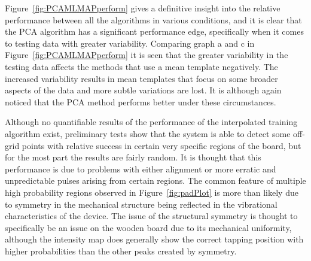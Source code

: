 Figure~\ref{fig:PCAMLMAPperform} gives a definitive insight into the relative performance between all the algorithms in various conditions, and it is clear that the PCA algorithm has a significant performance edge, specifically when it comes to testing data with greater variability. Comparing graph a and c in Figure~\ref{fig:PCAMLMAPperform} it is seen that the greater variability in the testing data affects the methods that use a mean template negatively. The increased variability results in mean templates that focus on some broader aspects of the data and more subtle variations are lost. It is although again noticed that the PCA method performs better under these circumstances.

Although no quantifiable results of the performance of the interpolated training algorithm exist, preliminary tests show that the system is able to detect some off- grid points with relative success in certain very specific regions of the board, but for the most part the results are fairly random. It is thought that this performance is due to problems with either alignment or more erratic and unpredictable pulses arising from certain regions. The common feature of multiple high probability regions observed in Figure~\ref{fig:padPlot} is more than likely due to symmetry in the mechanical structure being reflected in the vibrational characteristics of the device. The issue of the structural symmetry is thought to specifically be an issue on the wooden board due to its mechanical uniformity, although the intensity map does generally show the correct tapping position with higher probabilities than the other peaks created by symmetry.






